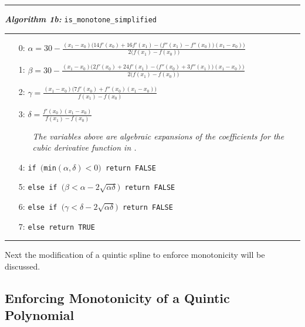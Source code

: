\documentclass{scspaperproc}
\theoremstyle{scsthe}
\begin{document}
\vspace{10pt}%
\hrule%
\vspace{3pt}%
\noindent\textbf{\textit{Algorithm 1b:}} \texttt{is\_monotone\_simplified}%
\vspace{3pt}%
\hrule%
\begin{itemize}
  \itemsep0pt
  \parskip0pt

\item[0:] $\alpha = 30 - \frac{(x_1 - x_0)\big( 14 f'(x_0) + 16 f'(x_1) - \big(f''(x_1) - f''(x_0) \big) (x_1 - x_0)\big)}{2\big(f(x_1) - f(x_0)\big)}$
\item[1:] $\beta = 30 - \frac{(x_1 - x_0)\big( 2 f'(x_0) + 24 f'(x_1) - \big(f''(x_0) + 3 f''(x_1) \big) (x_1 - x_0)\big)}{2\big(f(x_1) - f(x_0)\big)}$
\item[2:] $\gamma = \frac{(x_1 - x_0)\big( 7 f'(x_0) + f''(x_0) (x_1 - x_0) \big)}{f(x_1) - f(x_0)}$
\item[3:] $\delta = \frac{f'(x_0) (x_1 - x_0)}{f(x_1) - f(x_0)}$

  \begin{itemize}
    \item[] \textit{The variables above are algebraic expansions of the coefficients for the cubic derivative function in \cite{schmidt1988positivity}.}
  \end{itemize}

\item[4:] \texttt{if $\big($min$(\alpha, \delta) < 0\big)$ return FALSE}
\item[5:] \texttt{else if $\big(\beta < \alpha - 2 \sqrt{\alpha \delta}\big)$ return FALSE}
\item[6:] \texttt{else if $\big(\gamma < \delta - 2 \sqrt{\alpha \delta}\big)$ return FALSE}
\item[7:] \texttt{else return TRUE}

\end{itemize}
\hrule
\vspace{10pt}

Next the modification of a quintic spline to enforce monotonicity will be discussed.

\subsection{Enforcing Monotonicity of a Quintic Polynomial}
\label{make_monotone}
\end{document}
